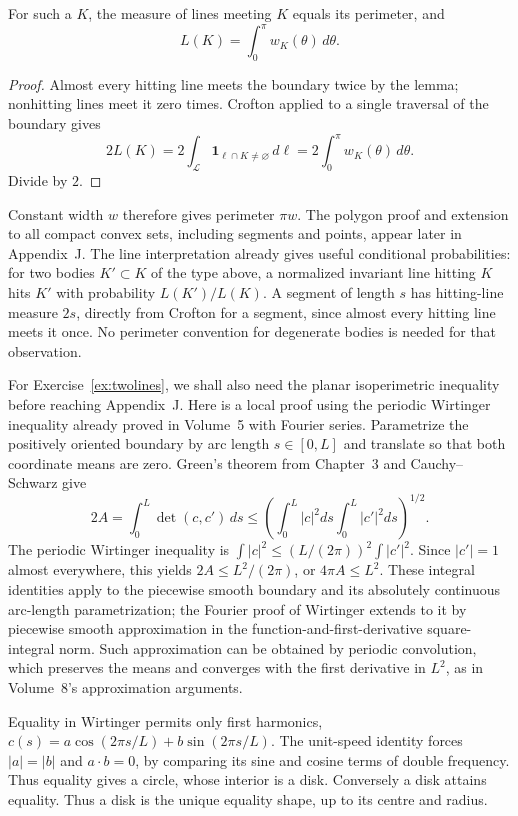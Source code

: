 \begin{theorem}\label{thm:cauchycrofton}
For such a $K$, the measure of lines meeting $K$ equals its perimeter, and
\[
L(K)=\int_0^\pi w_K(\theta)\,d\theta.
\]
\end{theorem}

\begin{proof}
Almost every hitting line meets the boundary twice by the lemma; nonhitting lines meet it zero times. Crofton applied to a single traversal of the boundary gives
\[
2L(K)=2\int_{\mathcal L}\mathbf1_{\ell\cap K\ne\varnothing}\,d\ell
=2\int_0^\pi w_K(\theta)\,d\theta.
\]
Divide by $2$.
\end{proof}

Constant width $w$ therefore gives perimeter $\pi w$. The polygon proof and extension to all compact convex sets, including segments and points, appear later in Appendix~J. The line interpretation already gives useful conditional probabilities: for two bodies $K'\subset K$ of the type above, a normalized invariant line hitting $K$ hits $K'$ with probability $L(K')/L(K)$. A segment of length $s$ has hitting-line measure $2s$, directly from Crofton for a segment, since almost every hitting line meets it once. No perimeter convention for degenerate bodies is needed for that observation.

For Exercise~\ref{ex:twolines}, we shall also need the planar isoperimetric inequality before reaching Appendix~J. Here is a local proof using the periodic Wirtinger inequality already proved in Volume~5 with Fourier series. Parametrize the positively oriented boundary by arc length $s\in[0,L]$ and translate so that both coordinate means are zero. Green's theorem from Chapter~3 and Cauchy--Schwarz give
\[
2A=\int_0^L\det(c,c')\,ds
\le\left(\int_0^L|c|^2ds\int_0^L|c'|^2ds\right)^{1/2}.
\]
The periodic Wirtinger inequality is
$\int|c|^2\le(L/(2\pi))^2\int|c'|^2$. Since $|c'|=1$ almost everywhere, this yields $2A\le L^2/(2\pi)$, or $4\pi A\le L^2$. These integral identities apply to the piecewise smooth boundary and its absolutely continuous arc-length parametrization; the Fourier proof of Wirtinger extends to it by piecewise smooth approximation in the function-and-first-derivative square-integral norm. Such approximation can be obtained by periodic convolution, which preserves the means and converges with the first derivative in $L^2$, as in Volume~8's approximation arguments.

Equality in Wirtinger permits only first harmonics, $c(s)=a\cos(2\pi s/L)+b\sin(2\pi s/L)$. The unit-speed identity forces $|a|=|b|$ and $a\cdot b=0$, by comparing its sine and cosine terms of double frequency. Thus equality gives a circle, whose interior is a disk. Conversely a disk attains equality. Thus a disk is the unique equality shape, up to its centre and radius.

